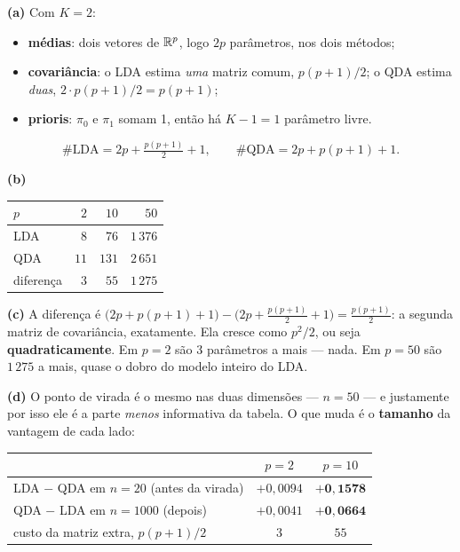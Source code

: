 \documentclass[11pt,a4paper]{article}
\begin{document}
\begin{solucao}
\textbf{(a)} Com $K=2$:
\begin{itemize}[leftmargin=1.4cm]
  \item \textbf{médias}: dois vetores de $\mathbb{R}^p$, logo $2p$ parâmetros, nos dois
        métodos;
  \item \textbf{covariância}: o LDA estima \emph{uma} matriz comum,
        $p(p+1)/2$; o QDA estima \emph{duas}, $2\cdot p(p+1)/2 = p(p+1)$;
  \item \textbf{prioris}: $\pi_0$ e $\pi_1$ somam 1, então há $K-1=1$ parâmetro
        livre.
\end{itemize}
\[
  \#\text{LDA} = 2p + \tfrac{p(p+1)}{2} + 1,
  \qquad
  \#\text{QDA} = 2p + p(p+1) + 1 .
\]

\smallskip
\textbf{(b)}
\begin{center}\small
\renewcommand{\arraystretch}{1.3}
\begin{tabular}{@{}lrrr@{}}
\toprule
$p$ & $2$ & $10$ & $50$ \\
\midrule
LDA & $8$  & $76$  & $1\,376$ \\
QDA & $11$ & $131$ & $2\,651$ \\
\midrule
diferença & $3$ & $55$ & $1\,275$ \\
\bottomrule
\end{tabular}
\end{center}

\smallskip
\textbf{(c)} A diferença é
$\big(2p+p(p+1)+1\big)-\big(2p+\tfrac{p(p+1)}{2}+1\big)=\tfrac{p(p+1)}{2}$: a
segunda matriz de covariância, exatamente. Ela cresce como $p^2/2$, ou seja
\textbf{quadraticamente}. Em $p=2$ são 3 parâmetros a mais --- nada. Em $p=50$ são
$1\,275$ a mais, quase o dobro do modelo inteiro do LDA.

\smallskip
\textbf{(d)} O ponto de virada é o mesmo nas duas dimensões --- $n=50$ --- e
justamente por isso ele é a parte \emph{menos} informativa da tabela. O que muda
é o \textbf{tamanho} da vantagem de cada lado:

\begin{center}\small
\renewcommand{\arraystretch}{1.2}
\begin{tabular}{@{}lcc@{}}
\toprule
                                    & $p=2$ & $p=10$ \\
\midrule
LDA $-$ QDA em $n=20$ (antes da virada)   & $+0{,}0094$ & $\mathbf{+0{,}1578}$ \\
QDA $-$ LDA em $n=1000$ (depois)          & $+0{,}0041$ & $\mathbf{+0{,}0664}$ \\
custo da matriz extra, $p(p+1)/2$         & $3$ & $55$ \\
\bottomrule
\end{tabular}
\end{center}


\end{solucao}
\end{document}

